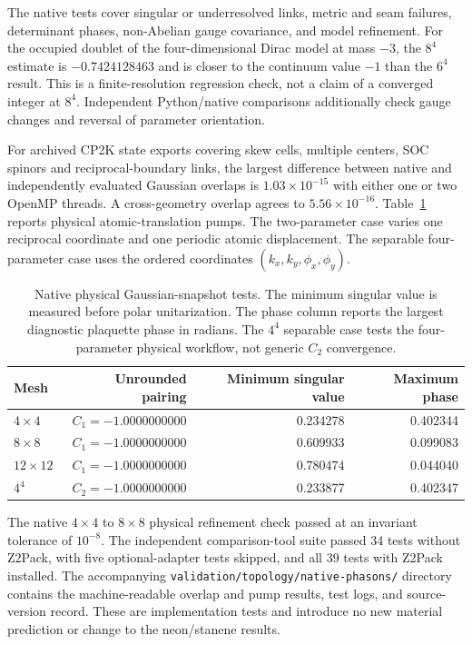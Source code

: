 \documentclass[11pt]{article}
\begin{document}
The native tests cover singular or underresolved links, metric and seam
failures, determinant phases, non-Abelian gauge covariance, and model
refinement. For the occupied doublet of the four-dimensional Dirac model
at mass $-3$, the $8^4$ estimate is $-0.7424128463$ and is closer to the
continuum value $-1$ than the $6^4$ result. This is a finite-resolution
regression check, not a claim of a converged integer at $8^4$.
Independent Python/native comparisons additionally check gauge changes
and reversal of parameter orientation.

For archived CP2K state exports covering skew cells, multiple centers,
SOC spinors and reciprocal-boundary links, the largest difference between
native and independently evaluated Gaussian overlaps is
$1.03\times10^{-15}$ with either one or two OpenMP threads. A
cross-geometry overlap agrees to $5.56\times10^{-16}$.
Table~\ref{tab:physical-pumps} reports physical atomic-translation pumps.
The two-parameter case varies one reciprocal coordinate and one periodic
atomic displacement. The separable four-parameter case uses the ordered
coordinates $(k_x,k_y,\phi_x,\phi_y)$.

\begin{table}[htbp]
\centering
\small
\caption{Native physical Gaussian-snapshot tests. The minimum singular
value is measured before polar unitarization. The phase column reports
the largest diagnostic plaquette phase in radians. The $4^4$ separable
case tests the four-parameter physical workflow, not generic $C_2$
convergence.}
\label{tab:physical-pumps}
\begin{tabular}{lrrr}
\toprule
Mesh & Unrounded pairing & Minimum singular value & Maximum phase \\
\midrule
$4\times4$ & $C_1=-1.0000000000$ & 0.234278 & 0.402344 \\
$8\times8$ & $C_1=-1.0000000000$ & 0.609933 & 0.099083 \\
$12\times12$ & $C_1=-1.0000000000$ & 0.780474 & 0.044040 \\
$4^4$ & $C_2=-1.0000000000$ & 0.233877 & 0.402347 \\
\bottomrule
\end{tabular}
\end{table}

The native $4\times4$ to $8\times8$ physical refinement check passed
at an invariant tolerance of $10^{-8}$. The independent comparison-tool
suite passed 34 tests without Z2Pack, with five optional-adapter tests
skipped, and all 39 tests with Z2Pack installed. The accompanying
\texttt{validation/topology/native-phasons/} directory contains the
machine-readable overlap and pump results, test logs, and source-version
record. These are implementation tests and introduce no new material
prediction or change to the neon/stanene results.
\end{document}
